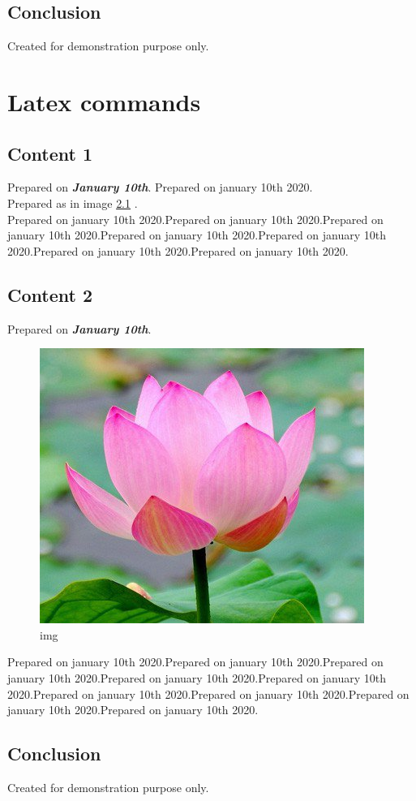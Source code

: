 \documentclass[12pt]{report} %
\begin{document}
\begin{multicols}{2}
\section{Conclusion} Created for demonstration purpose only.
\chapter{Latex commands}
\section{Content 1} Prepared on \textit{\textbf{January 10th}}.
Prepared on january 10th 2020.\\Prepared as in image  \ref{fig1} .\\ Prepared on january 10th 2020.Prepared on january 10th 2020.Prepared on january 10th 2020.Prepared on january 10th 2020.Prepared on january 10th 2020.Prepared on january 10th 2020.Prepared on january 10th 2020.
\section{Content 2} Prepared on \textit{\textbf{January 10th}}.
\begin{figure}[h!]
\includegraphics[scale=0.25]{Summer_Flowers_Lotus.jpg}
\caption{img}
\label{fig1}
\end{figure}

Prepared on january 10th 2020.Prepared on january 10th 2020.Prepared on january 10th 2020.Prepared on january 10th 2020.Prepared on january 10th 2020.Prepared on january 10th 2020.Prepared on january 10th 2020.Prepared on january 10th 2020.Prepared on january 10th 2020.



\section{Conclusion} Created for demonstration purpose only.
\end{multicols}
\end{document}
